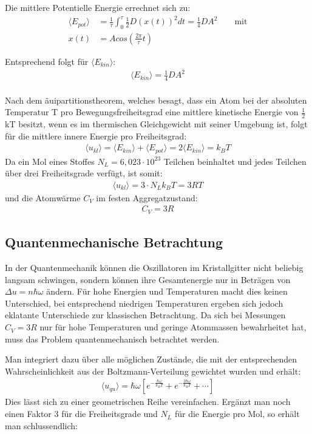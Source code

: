 Die mittlere Potentielle Energie errechnet sich zu:
\begin{align*}
\langle E_{pot}\rangle &= \frac{1}{\tau} \int^\tau_0 \frac{1}{2} D \left( x(t) \right)^2 dt =  \frac{1}{4} D A^2 \qquad \text{mit}\\
x(t)&=Acos\left(\frac{2\pi}{\tau}t\right)
\end{align*}

Entsprechend folgt für $\langle E_{kin}\rangle$:
\begin{align*}
\langle E_{kin}\rangle = \frac{1}{4} DA^2
\end{align*}\\

Nach dem äuipartitionstheorem, welches besagt, dass ein Atom bei der absoluten Temperatur T pro Bewegungsfreiheitsgrad eine
mittlere kinetische Energie von $\frac{1}{2}$ kT besitzt, wenn es im thermischen Gleichgewicht mit seiner Umgebung ist, folgt für die mittlere innere Energie pro Freiheitsgrad:
\begin{align*}
\langle u_{kl} \rangle = \langle E_{kin}\rangle + \langle E_{pot}\rangle = 2\langle E_{kin}\rangle = k_B T
\end{align*}
Da ein Mol eines Stoffes $N_L = 6,023\cdot 10^{23}$ Teilchen beinhaltet und jedes Teilchen über drei Freiheitsgrade verfügt, ist somit:
\begin{align*}
\langle u_{kl} \rangle = 3\cdot N_L k_B T = 3RT
\end{align*}
und die Atomwärme $C_V$ im festen Aggregatzustand:
\begin{align*}
C_V =3R
\end{align*}
\subsection{Quantenmechanische Betrachtung}
In der Quantenmechanik können die Oszillatoren im Kristallgitter nicht beliebig langsam schwingen, sondern können ihre Gesamtenergie nur in Beträgen von $\Delta u = n\hbar \omega$ ändern. Für hohe Energien und Temperaturen macht dies keinen Unterschied, bei entsprechend niedrigen Temperaturen ergeben sich jedoch eklatante Unterschiede zur klassischen Betrachtung. Da sich bei Messungen $C_V = 3R$ nur für hohe Temperaturen und geringe Atommassen bewahrheitet hat, muss das Problem quantenmechanisch betrachtet werden.

Man integriert dazu über alle möglichen Zustände, die mit der entsprechenden Wahrscheinlichkeit aus der Boltzmann-Verteilung gewichtet wurden und erhält:
\begin{align*}
\langle u_{qu} \rangle = \hbar \omega \left[ e^{-\frac{\hbar \omega}{k_BT}} +e^{-\frac{2\hbar \omega}{k_BT}}+\cdots\right]
\end{align*} 
Dies lässt sich zu einer geometrischen Reihe vereinfachen. Ergänzt man noch einen Faktor 3 für die Freiheitsgrade und $N_L$ für die Energie pro Mol, so erhält man schlussendlich:

